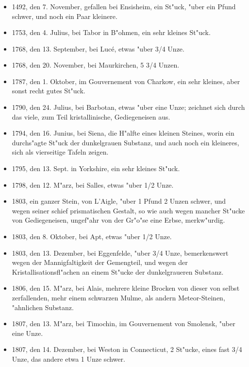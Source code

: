 \documentclass[a4paper, 11pt, oneside, polutonikogreek, german]{article}
\begin{document}
\subsubsection*{}
\begin{itemize}
    \item 1492, den 7. November, gefallen bei Ensisheim, ein St"uck, "uber ein Pfund schwer, und noch ein Paar kleinere.
    \item 1753, den 4. Julius, bei Tabor in B"ohmen, ein sehr kleines St"uck.
    \item 1768, den 13. September, bei Lucé, etwas "uber 3/4 Unze.
    \item 1768, den 20. November, bei Maurkirchen, 5 3/4 Unzen.
    \item 1787, den 1. Oktober, im Gouvernement von Charkow, ein sehr kleines, aber sonst recht gutes St"uck.
    \item 1790, den 24. Julius, bei Barbotan, etwas "uber eine Unze; zeichnet sich durch das viele, zum Teil kristallinische, Gediegeneisen aus.
    \item 1794, den 16. Junius, bei Siena, die H"alfte eines kleinen Steines, worin ein durchs"agte St"uck der dunkelgrauen Substanz, und auch noch ein kleineres, sich als vierseitige Tafeln zeigen.
    \item 1795, den 13. Sept. in Yorkshire, ein sehr kleines St"uck.
    \item 1798, den 12. M"arz, bei Salles, etwas "uber 1/2 Unze.
    \item 1803, ein ganzer Stein, von L'Aigle, "uber 1 Pfund 2 Unzen schwer, und wegen seiner schief prismatischen Gestalt, so wie auch wegen mancher St"ucke von Gediegeneisen, ungef"ahr von der Gr"o"se eine Erbse, merkw"urdig.
    \item 1803, den 8. Oktober, bei Apt, etwas "uber 1/2 Unze.
    \item 1803, den 13. Dezember, bei Eggenfelde, "uber 3/4 Unze, bemerkenswert wegen der Mannigfaltigkeit der Gemengteil, und wegen der Kristallisationsfl"achen an einem St"ucke der dunkelgraueren Substanz.
    \item 1806, den 15. M"arz, bei Alais, mehrere kleine Brocken von dieser von selbst zerfallenden, mehr einem schwarzen Mulme, als andern Meteor-Steinen, "ahnlichen Substanz.
    \item 1807, den 13. M"arz, bei Timochin, im Gouvernement von Smolensk, "uber eine Unze.
    \item 1807, den 14. Dezember, bei Weston in Connecticut, 2 St"ucke, eines fast 3/4 Unze, das andere etwa 1 Unze schwer.

\end{itemize}
\end{document}

